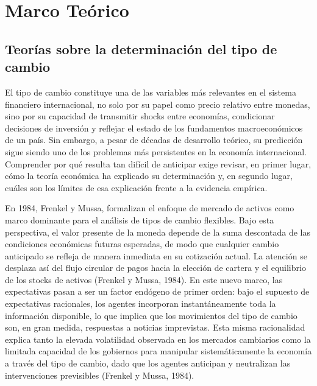 ﻿\documentclass[11pt,a4paper]{article}
\begin{document}
\section{Marco Teórico}
\subsection{Teorías sobre la determinación del tipo de cambio}

El tipo de cambio constituye una de las variables más relevantes en el sistema financiero internacional, no solo por su papel como precio relativo entre monedas, sino por su capacidad de transmitir shocks entre economías, condicionar decisiones de inversión y reflejar el estado de los fundamentos macroeconómicos de un país. Sin embargo, a pesar de décadas de desarrollo teórico, su predicción sigue siendo uno de los problemas más persistentes en la economía internacional. Comprender por qué resulta tan difícil de anticipar exige revisar, en primer lugar, cómo la teoría económica ha explicado su determinación y, en segundo lugar, cuáles son los límites de esa explicación frente a la evidencia empírica.

En 1984, Frenkel y Mussa, formalizan el enfoque de mercado de activos como marco dominante para el análisis de tipos de cambio flexibles. Bajo esta perspectiva, el valor presente de la moneda depende de la suma descontada de las condiciones económicas futuras esperadas, de modo que cualquier cambio anticipado se refleja de manera inmediata en su cotización actual. La atención se desplaza así del flujo circular de pagos hacia la elección de cartera y el equilibrio de los stocks de activos (Frenkel y Mussa, 1984). En este nuevo marco, las expectativas pasan a ser un factor endógeno de primer orden: bajo el supuesto de expectativas racionales, los agentes incorporan instantáneamente toda la información disponible, lo que implica que los movimientos del tipo de cambio son, en gran medida, respuestas a noticias imprevistas. Esta misma racionalidad explica tanto la elevada volatilidad observada en los mercados cambiarios como la limitada capacidad de los gobiernos para manipular sistemáticamente la economía a través del tipo de cambio, dado que los agentes anticipan y neutralizan las intervenciones previsibles (Frenkel y Mussa, 1984).
\end{document}
